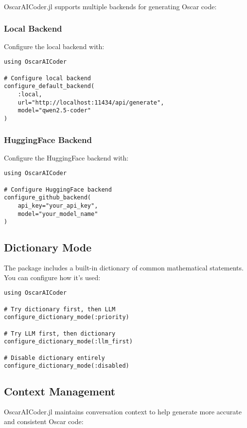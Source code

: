 \documentclass[11pt,a4paper]{article}
\begin{document}
OscarAICoder.jl supports multiple backends for generating Oscar code:

\subsubsection{Local Backend}

Configure the local backend with:

\begin{lstlisting}
using OscarAICoder

# Configure local backend
configure_default_backend(
    :local,
    url="http://localhost:11434/api/generate",
    model="qwen2.5-coder"
)
\end{lstlisting}

\subsubsection{HuggingFace Backend}

Configure the HuggingFace backend with:

\begin{lstlisting}
using OscarAICoder

# Configure HuggingFace backend
configure_github_backend(
    api_key="your_api_key",
    model="your_model_name"
)
\end{lstlisting}

\subsection{Dictionary Mode}

The package includes a built-in dictionary of common mathematical statements. You can configure how it's used:

\begin{lstlisting}
using OscarAICoder

# Try dictionary first, then LLM
configure_dictionary_mode(:priority)

# Try LLM first, then dictionary
configure_dictionary_mode(:llm_first)

# Disable dictionary entirely
configure_dictionary_mode(:disabled)
\end{lstlisting}

\subsection{Context Management}

OscarAICoder.jl maintains conversation context to help generate more accurate and consistent Oscar code:
\end{document}
